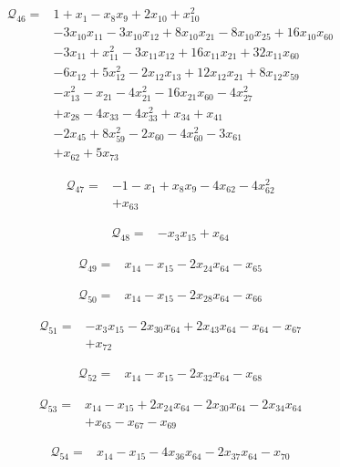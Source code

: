 \begin{align*}
\mathcal{Q}_{46}={}&1+x_{1}-x_{8}x_{9}+2x_{10}+x_{10}^{2}\\
&-3x_{10}x_{11}-3x_{10}x_{12}+8x_{10}x_{21}-8x_{10}x_{25}+16x_{10}x_{60}\\
&-3x_{11}+x_{11}^{2}-3x_{11}x_{12}+16x_{11}x_{21}+32x_{11}x_{60}\\
&-6x_{12}+5x_{12}^{2}-2x_{12}x_{13}+12x_{12}x_{21}+8x_{12}x_{59}\\
&-x_{13}^{2}-x_{21}-4x_{21}^{2}-16x_{21}x_{60}-4x_{27}^{2}\\
&+x_{28}-4x_{33}-4x_{33}^{2}+x_{34}+x_{41}\\
&-2x_{45}+8x_{59}^{2}-2x_{60}-4x_{60}^{2}-3x_{61}\\
&+x_{62}+5x_{73}
\end{align*}

\begin{align*}
\mathcal{Q}_{47}={}&-1-x_{1}+x_{8}x_{9}-4x_{62}-4x_{62}^{2}\\
&+x_{63}
\end{align*}

\begin{align*}
\mathcal{Q}_{48}={}&-x_{3}x_{15}+x_{64}
\end{align*}

\begin{align*}
\mathcal{Q}_{49}={}&x_{14}-x_{15}-2x_{24}x_{64}-x_{65}
\end{align*}

\begin{align*}
\mathcal{Q}_{50}={}&x_{14}-x_{15}-2x_{28}x_{64}-x_{66}
\end{align*}

\begin{align*}
\mathcal{Q}_{51}={}&-x_{3}x_{15}-2x_{30}x_{64}+2x_{43}x_{64}-x_{64}-x_{67}\\
&+x_{72}
\end{align*}

\begin{align*}
\mathcal{Q}_{52}={}&x_{14}-x_{15}-2x_{32}x_{64}-x_{68}
\end{align*}

\begin{align*}
\mathcal{Q}_{53}={}&x_{14}-x_{15}+2x_{24}x_{64}-2x_{30}x_{64}-2x_{34}x_{64}\\
&+x_{65}-x_{67}-x_{69}
\end{align*}

\begin{align*}
\mathcal{Q}_{54}={}&x_{14}-x_{15}-4x_{36}x_{64}-2x_{37}x_{64}-x_{70}
\end{align*}


